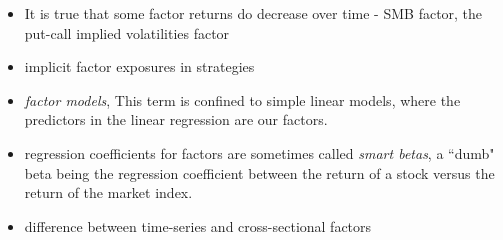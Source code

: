 \documentclass[11pt]{article}
\begin{document}
\begin{itemize}
        \item It is true that some factor returns do decrease over time - SMB factor, the put-call implied volatilities factor
        \item implicit factor exposures in strategies
        \item \textit{factor models}, This term is confined to simple linear models, where the predictors in the linear regression are our factors.
        \item regression coefficients for factors are sometimes called \textit{smart betas}, a ``dumb" beta being the regression coefficient between the return of a
        stock versus the return of the market index.
        \item difference between time-series and cross-sectional factors
    \end{itemize}
\end{document}
